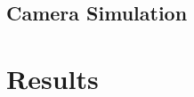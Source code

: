 \documentclass[10pt,twocolumn,letterpaper]{article}
\begin{document}


\subsection{Camera Simulation}



\section{Results}




{\small


}
\end{document}
